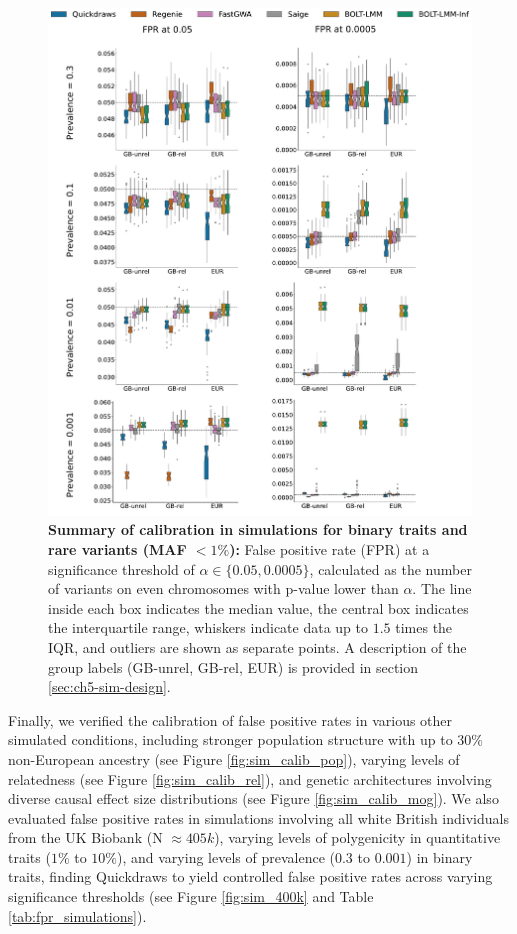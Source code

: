 \begin{figure}[h!]
    \centering
    \includegraphics[width=\textwidth]{figures/sim_calibration/bt_fpr_rare.pdf}
    \caption{\textbf{Summary of calibration in simulations for binary traits and rare variants (MAF $< 1\%$): }
    False positive rate (FPR) at a significance threshold of $\alpha \in \{0.05, 0.0005\}$, calculated as the number of variants on even chromosomes with p-value lower than $\alpha$.
    The line inside each box indicates the median value, the central box indicates the interquartile range, whiskers indicate data up to $1.5$ times the IQR, and outliers are shown as separate points.
    A description of the group labels (GB-unrel, GB-rel, EUR) is provided in section \ref{sec:ch5-sim-design}.
    \label{fig:qd_sim_fpr_bt2}
    }
\end{figure}

%
Finally, we verified the calibration of false positive rates in various other simulated conditions, including stronger population structure with up to $30\%$ non-European ancestry (see Figure \ref{fig:sim_calib_pop}), varying levels of relatedness (see Figure \ref{fig:sim_calib_rel}), and genetic architectures involving diverse causal effect size distributions (see Figure \ref{fig:sim_calib_mog}).
%
We also evaluated false positive rates in simulations involving all white British individuals from the UK Biobank (N $\approx 405k$), varying levels of polygenicity in quantitative traits ($1\%$ to $10\%$), and varying levels of prevalence ($0.3$ to $0.001$) in binary traits, finding Quickdraws to yield controlled false positive rates across varying significance thresholds (see Figure \ref{fig:sim_400k} and Table \ref{tab:fpr_simulations}).
%


